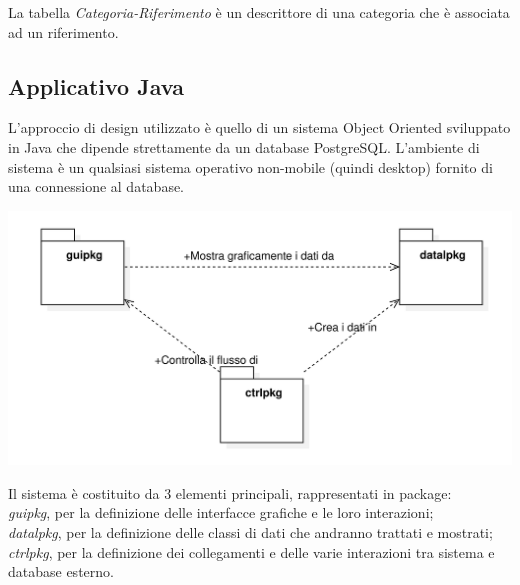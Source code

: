 La tabella \textit{Categoria-Riferimento} è un descrittore di una categoria che è associata ad  un riferimento. \\
\raggedright{\subsection{Applicativo Java}}
L’approccio di design utilizzato è quello di un sistema Object Oriented sviluppato in Java che dipende strettamente da un database PostgreSQL. L’ambiente di sistema è un qualsiasi sistema operativo non-mobile (quindi desktop) fornito di una connessione al database.
\begin{center}
    \hspace{-1cm}
        \includegraphics[width=.90\textwidth]{Immagini/VecchioProgetto/UML OO Java vecchioProgetto.png} 
\end{center}

Il sistema è costituito da 3 elementi principali, rappresentati in package: \\
\textit{guipkg}, per la definizione delle interfacce grafiche e le loro interazioni; \\ 
\textit{datalpkg}, per la definizione delle classi di dati che andranno trattati e mostrati;\\
\textit{ctrlpkg}, per la definizione dei collegamenti e delle varie interazioni tra sistema e database esterno.

